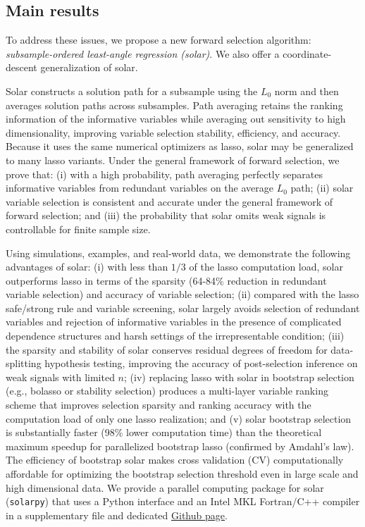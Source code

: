 \documentclass[11pt,review,authoryear]{elsarticle}
\begin{document}
\subsection{Main results}

To address these issues, we propose a new forward selection algorithm: \emph{subsample-ordered least-angle regression (solar)}. We also offer a coordinate-descent generalization of solar.

Solar constructs a solution path for a subsample using the $L_0$ norm and then averages solution paths across subsamples. Path averaging retains the ranking information of the informative variables while averaging out sensitivity to high dimensionality, improving variable selection stability, efficiency, and accuracy. Because it uses the same numerical optimizers as lasso, solar may be generalized to many lasso variants. Under the \citet{zhang09} general framework of forward selection, we prove that: (i) with a high probability, path averaging perfectly separates informative variables from redundant variables on the average $L_0$ path; (ii) solar variable selection is consistent and accurate under the general framework of forward selection; and (iii) the probability that solar omits weak signals is controllable for finite sample size.

Using simulations, examples, and real-world data, we demonstrate the following advantages of solar: (i) with less than $1/3$ of the lasso computation load, solar outperforms lasso in terms of the sparsity (64-84\% reduction in redundant variable selection) and accuracy of variable selection; (ii) compared with the lasso safe/strong rule and variable screening, solar largely avoids selection of redundant variables and rejection of informative variables in the presence of complicated dependence structures and harsh settings of the irrepresentable condition; (iii) the sparsity and stability of solar conserves residual degrees of freedom for data-splitting hypothesis testing, improving the accuracy of post-selection inference on weak signals with limited $n$; (iv) replacing lasso with solar in bootstrap selection (e.g., bolasso or stability selection) produces a multi-layer variable ranking scheme that improves selection sparsity and ranking accuracy with the computation load of only one lasso realization; and (v) solar bootstrap selection is substantially faster (98\% lower computation time) than the theoretical maximum speedup for parallelized bootstrap lasso (confirmed by Amdahl's law). The efficiency of bootstrap solar makes cross validation (CV) computationally affordable for optimizing the bootstrap selection threshold even in large scale and high dimensional data. We provide a parallel computing package for solar (\texttt{solarpy}) that uses a Python interface and an Intel MKL Fortran/C++ compiler in a supplementary file and dedicated \href{https://github.com/isaac2math/solarpy}{Github page}.
\end{document}
